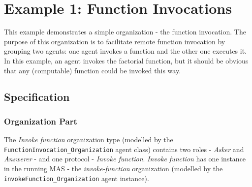 
\section{Example 1: Function Invocations}

This example demonstrates a simple organization - the function invocation.
The purpose of this organization is to facilitate remote function invocation by grouping two agents: one agent invokes a function and the other one executes it.
In this example, an agent invokes the factorial function, but it should be obvious that any (computable) function could be invoked this way.

\subsection*{Specification}

\subsubsection*{Organization Part}

The \textit{Invoke function} organization type (modelled by the \texttt{FunctionInvocation\_Organization} agent class) contains two roles - \textit{Asker} and \textit{Answerer} - and one protocol - \textit{Invoke function}.
\textit{Invoke function} has one instance in the running MAS - the \textit{invoke-function} organization (modelled by the \texttt{invokeFunction\_Organization} agent instance).

